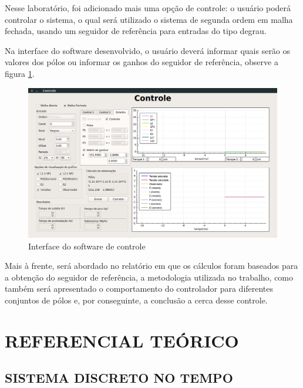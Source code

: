 \documentclass[a4paper,12pt]{article}
\begin{document}
\hspace{4ex}Nesse laboratório, foi adicionado mais uma opção de controle: o usuário poderá controlar o sistema, o qual será utilizado o sistema de segunda ordem em malha fechada, usando um seguidor de referência para entradas do tipo degrau.

\hspace{4ex}Na interface do software desenvolvido, o usuário deverá informar quais serão os valores dos pólos ou informar os ganhos do seguidor de referência, observe a figura \ref{interface}.

\begin{figure}[H]
\centering
\includegraphics[width=13cm]{FotosSeguidor/telaRef.png}
\caption{Interface do software de controle}
\label{interface}
\end{figure}

\hspace{4ex}Mais à frente, será abordado no relatório em que os cálculos foram baseados para a obtenção do seguidor de referência, a metodologia utilizada no trabalho, como também será apresentado o comportamento do controlador para diferentes conjuntos de pólos e, por conseguinte, a conclusão a cerca desse controle.


\newpage


\thispagestyle{main}

\section{REFERENCIAL TEÓRICO}

\subsection{SISTEMA DISCRETO NO TEMPO}
\end{document}
